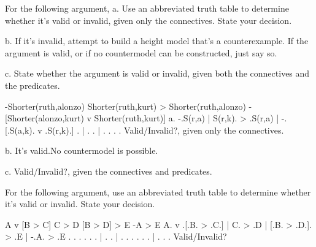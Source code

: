 \endproblems

For the following argument,
\list
a. Use an abbreviated truth table to determine whether it's valid or invalid, given only the connectives. State your decision.

b. If it's invalid, attempt to build a height model that's a counterexample. If the argument is valid, or if no countermodel can be constructed, just say so.

c. State whether the argument is valid or invalid, given both the connectives and the predicates.
\endlist

\problems
{}
\argument
 -Shorter(ruth,alonzo)
 Shorter(ruth,kurt) > Shorter(ruth,alonzo)
\argumentline
 -[Shorter(alonzo,kurt) v Shorter(ruth,kurt)]
\endargument
	\answerlist
	a.
	\truthtable
	 -.S(r,a) | S(r,k). > .S(r,a) | -.[.S(a,k). v .S(r,k).]
	\truthtableline
	  .       |       .   .       |  . .      .   .
	\endtruthtable
	Valid/Invalid?, given only the connectives.

	b. It's valid.\OR No countermodel is possible.\OR
	\heightmodel
	 
	\endheightmodel

	c. Valid/Invalid?, given the connectives and predicates.
	\endanswerlist

\endproblems

For the following argument, use an abbreviated truth table to determine whether it's valid or invalid. State your decision.

\problems
{}
\argument
 A v [B > C]
 C > D
 [B > D] > E
\argumentline
 -A > E
\endargument
	\answer
	\truthtable
	 A. v .[.B. > .C.] | C. > .D | [.B. > .D.]. > .E | -.A. > .E
	\truthtableline
	  .   . . .   . .  |  .   .  |  . .   . . .   .  |  . .   .
	\endtruthtable
	Valid/Invalid?
	\endanswer

\endproblems
\bye
